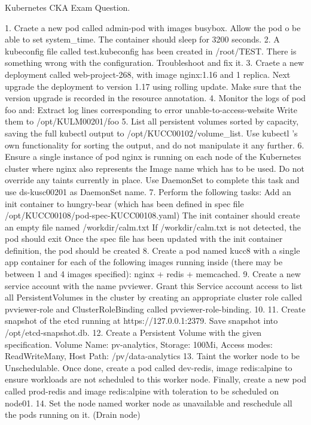 Kubernetes CKA Exam Question.


1. Craete a new pod called admin-pod with images busybox. Allow the pod o be able to set system_time. The container should sleep for 3200 seconds.
2. A kubeconfig file called test.kubeconfig has been created in /root/TEST. There is something wrong with the configuration. Troubleshoot and fix it.
3. Craete a new deployment called web-project-268, with image nginx:1.16 and 1 replica. Next upgrade the deployment to version 1.17 using rolling update. Make sure that the version upgrade is recorded in the resource annotation.
4. Monitor the logs of pod foo and: Extract log lines corresponding to error unable-to-access-website Write them to /opt/KULM00201/foo
5. List all persistent volumes sorted by capacity, saving the full kubectl output to /opt/KUCC00102/volume_list. Use kubectl 's own functionality for sorting the output, and do not manipulate it any further.
6. Ensure a single instance of pod nginx is running on each node of the Kubernetes cluster where nginx also represents the Image name which has to be used. Do not override any taints currently in place.
Use DaemonSet to complete this task and use ds-kusc00201 as DaemonSet name.
7. Perform the following tasks: Add an init container to hungry-bear (which has been defined in spec file /opt/KUCC00108/pod-spec-KUCC00108.yaml) The init container should create an empty file named
/workdir/calm.txt If /workdir/calm.txt is not detected, the pod should exit Once the spec file has been updated with the init container definition, the pod should be created
8. Create a pod named kucc8 with a single app container for each of the following images running inside (there may be between 1 and 4 images specified): nginx + redis + memcached.
9. Create a new service account with the name pvviewer. Grant this Service account access to list all PersistentVolumes in the cluster by creating an appropriate cluster role called 
pvviewer-role and ClusterRoleBinding called pvviewer-role-binding.
10. 
11. Create snapshot of the etcd running at https://127.0.0.1:2379. Save snapshot into /opt/etcd-snapshot.db.
12. Create a Persistent Volume with the given specification. Volume Name: pv-analytics, Storage: 100Mi, Access modes: ReadWriteMany, Host Path: /pv/data-analytics
13. Taint the worker node to be Unschedulable. Once done, create a pod called dev-redis, image redis:alpine to ensure workloads are not scheduled to this worker node. Finally, 
create a new pod called prod-redis and image redis:alpine with toleration to be scheduled on node01.
14. Set the node named worker node as unavailable and reschedule all the pods running on it. (Drain node)

